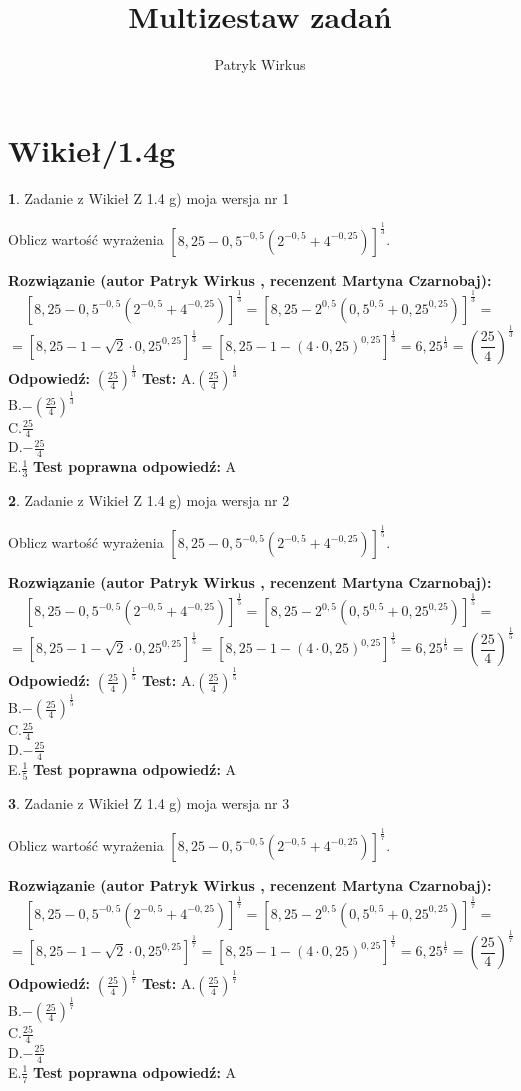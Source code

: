 \documentclass[12pt, a4paper]{article}
\title{Multizestaw zadań}
\author{Patryk Wirkus}
\date{}
\theoremstyle{definition} %
\newtheorem{zad}{}
\newcommand{\kategoria}[1]{\section{#1}}
\newcommand{\zadStart}[1]{\begin{zad}#1\newline}
\newcommand{\zadStop}{\end{zad}}
\newcommand{\rozwStart}[2]{\noindent \textbf{Rozwiązanie (autor #1 , recenzent #2): }\newline}
\newcommand{\rozwStop}{\newline}
\newcommand{\odpStart}{\noindent \textbf{Odpowiedź:}\newline}
\newcommand{\odpStop}{\newline}
\newcommand{\testStart}{\noindent \textbf{Test:}\newline}
\newcommand{\testStop}{\newline}
\newcommand{\kluczStart}{\noindent \textbf{Test poprawna odpowiedź:}\newline}
\newcommand{\kluczStop}{\newline}
\begin{document}
\maketitle

\kategoria{Wikieł/1.4g}


\zadStart{Zadanie z Wikieł Z 1.4 g) moja wersja nr 1}

Oblicz wartość wyrażenia $[8,25-0,5^{-0,5}(2^{-0,5}+4^{-0,25})]^{\frac{1}{3}}$.
\zadStop
\rozwStart{Patryk Wirkus}{Martyna Czarnobaj}
$$[8,25-0,5^{-0,5}(2^{-0,5}+4^{-0,25})]^{\frac{1}{3}} = [8,25-2^{0,5}(0,5^{0,5}+0,25^{0,25})]^{\frac{1}{3}} =$$
$$=[8,25 - 1 - \sqrt{2} \cdot 0,25^{0,25}]^{\frac{1}{3}} = [8,25 - 1 - (4\cdot 0,25)^{0,25}]^{\frac{1}{3}} = 6,25^{\frac{1}{3}} = (\frac{25}{4})^{\frac{1}{3}}$$
\rozwStop
\odpStart
$(\frac{25}{4})^{\frac{1}{3}}$
\odpStop
\testStart
A.$(\frac{25}{4})^{\frac{1}{3}}$\\ B.$-(\frac{25}{4})^{\frac{1}{3}}$\\ C.$\frac{25}{4}$\\ D.$-\frac{25}{4}$\\ E.$\frac{1}{3}$
\testStop
\kluczStart
A
\kluczStop



\zadStart{Zadanie z Wikieł Z 1.4 g) moja wersja nr 2}

Oblicz wartość wyrażenia $[8,25-0,5^{-0,5}(2^{-0,5}+4^{-0,25})]^{\frac{1}{5}}$.
\zadStop
\rozwStart{Patryk Wirkus}{Martyna Czarnobaj}
$$[8,25-0,5^{-0,5}(2^{-0,5}+4^{-0,25})]^{\frac{1}{5}} = [8,25-2^{0,5}(0,5^{0,5}+0,25^{0,25})]^{\frac{1}{5}} =$$
$$=[8,25 - 1 - \sqrt{2} \cdot 0,25^{0,25}]^{\frac{1}{5}} = [8,25 - 1 - (4\cdot 0,25)^{0,25}]^{\frac{1}{5}} = 6,25^{\frac{1}{5}} = (\frac{25}{4})^{\frac{1}{5}}$$
\rozwStop
\odpStart
$(\frac{25}{4})^{\frac{1}{5}}$
\odpStop
\testStart
A.$(\frac{25}{4})^{\frac{1}{5}}$\\ B.$-(\frac{25}{4})^{\frac{1}{5}}$\\ C.$\frac{25}{4}$\\ D.$-\frac{25}{4}$\\ E.$\frac{1}{5}$
\testStop
\kluczStart
A
\kluczStop



\zadStart{Zadanie z Wikieł Z 1.4 g) moja wersja nr 3}

Oblicz wartość wyrażenia $[8,25-0,5^{-0,5}(2^{-0,5}+4^{-0,25})]^{\frac{1}{7}}$.
\zadStop
\rozwStart{Patryk Wirkus}{Martyna Czarnobaj}
$$[8,25-0,5^{-0,5}(2^{-0,5}+4^{-0,25})]^{\frac{1}{7}} = [8,25-2^{0,5}(0,5^{0,5}+0,25^{0,25})]^{\frac{1}{7}} =$$
$$=[8,25 - 1 - \sqrt{2} \cdot 0,25^{0,25}]^{\frac{1}{7}} = [8,25 - 1 - (4\cdot 0,25)^{0,25}]^{\frac{1}{7}} = 6,25^{\frac{1}{7}} = (\frac{25}{4})^{\frac{1}{7}}$$
\rozwStop
\odpStart
$(\frac{25}{4})^{\frac{1}{7}}$
\odpStop
\testStart
A.$(\frac{25}{4})^{\frac{1}{7}}$\\ B.$-(\frac{25}{4})^{\frac{1}{7}}$\\ C.$\frac{25}{4}$\\ D.$-\frac{25}{4}$\\ E.$\frac{1}{7}$
\testStop
\kluczStart
A
\kluczStop
\end{document}
